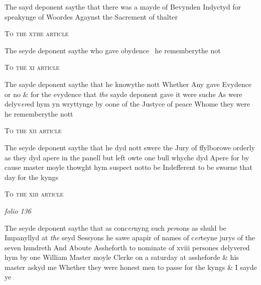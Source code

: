 \documentclass[12pt, a4paper]{book}
\begin{document}
            		
		\ifthenelse{\isodd{\thepage}}
		{\reversemarginpar}
		{\normalmarginpar}
		The sayd deponent saythe that there was a mayde of Bevynden Indyctyd for speakynge of Woordes Agaynst the Sacrement of thalter
            		
				\begin{center}  {\scshape To the xthe article}  \end{center}
			
            		
		\ifthenelse{\isodd{\thepage}}
		{\reversemarginpar}
		{\normalmarginpar}
		The seyde deponent saythe who gave obydence  he rememberythe  not
            		
            		
				\begin{center}  {\scshape To the xi article}  \end{center}
			
            		
		\ifthenelse{\isodd{\thepage}}
		{\reversemarginpar}
		{\normalmarginpar}
		The sayde deponent saythe that he knowythe nott Whether Any gave Evydence or no \& for the evydence that \textit{the }sayde deponent gave it were suche As were delyv\textit{er}ed hym yn wryttynge by oone of the Justyce of peace Whome they were he rememberythe nott
            		
				\begin{center}  {\scshape To the xii article}  \end{center}
			
            			
		\ifthenelse{\isodd{\thepage}}
		{\reversemarginpar}
		{\normalmarginpar}
		The seyde deponent saythe that he dyd nott swere the Jury of ffylborowe orderly as they dyd apere in the panell but left owte one bull whyche dyd Apere for by cause master moyle thowght hym suspect notto be Indefferent to be sworne that day for the kyngs
            		
            		
				\begin{center}  {\scshape To the xiii article}  \end{center}
			

\dotfill
					

\textit{folio 136}


 	
		\ifthenelse{\isodd{\thepage}}
		{\reversemarginpar}
		{\normalmarginpar}
		The seyde deponent saythe that as conc\textit{er}nyng such \textit{per}sons as shuld be Impanyllyd at \textit{the} seyd Sessyons he sawe apapir of  names of c\textit{er}teyne jurys of the seven hundreth And Aboute Assheforth to nominate of xviii persones
			 delyvered hym by one William Master moyle Clerke on a saturday at assheforde
			 \& his master askyd me Whether they were honest men to passe for the kyngs \& I sayde ye
 	
\end{document}
